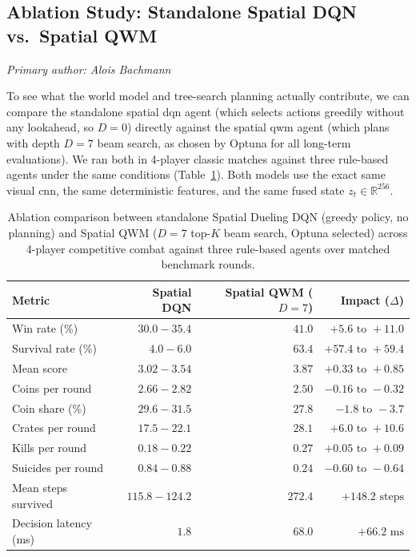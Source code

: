 \subsection{Ablation Study: Standalone Spatial DQN vs.\ Spatial QWM}\label{subsec:spatial_dqn_ablation}

\textit{Primary author: Alois Bachmann}

To see what the world model and tree-search planning actually contribute, we can compare the standalone spatial dqn agent (which selects actions greedily without any lookahead, so $D=0$) directly against the spatial qwm agent (which plans with depth $D=7$ beam search, as chosen by Optuna for all long-term evaluations). We ran both in 4-player classic matches against three rule-based agents under the same conditions (Table~\ref{tab:dqn_vs_qwm_ablation}). Both models use the exact same visual cnn, the same deterministic features, and the same fused state $z_t \in \mathbb{R}^{256}$.

\begin{table}[t]
  \centering
  \small
  \caption{Ablation comparison between standalone Spatial Dueling DQN (greedy policy, no planning) and Spatial QWM ($D=7$ top-$K$ beam search, Optuna selected) across 4-player competitive combat against three rule-based agents over matched benchmark rounds.}
  \label{tab:dqn_vs_qwm_ablation}
  \begin{tabular}{lrrr}
    \toprule
    Metric & Spatial DQN & Spatial QWM ($D=7$) & Impact ($\Delta$) \\
    \midrule
    Win rate (\%)           & $30.0 - 35.4$ & $41.0$ & $+5.6\text{ to }+11.0$ \\
    Survival rate (\%)      & $4.0 - 6.0$   & $63.4$ & $+57.4\text{ to }+59.4$ \\
    Mean score              & $3.02 - 3.54$ & $3.87$ & $+0.33\text{ to }+0.85$ \\
    Coins per round         & $2.66 - 2.82$ & $2.50$ & $-0.16\text{ to }-0.32$ \\
    Coin share (\%)         & $29.6 - 31.5$ & $27.8$ & $-1.8\text{ to }-3.7$ \\
    Crates per round        & $17.5 - 22.1$ & $28.1$ & $+6.0\text{ to }+10.6$ \\
    Kills per round         & $0.18 - 0.22$ & $0.27$ & $+0.05\text{ to }+0.09$ \\
    Suicides per round      & $0.84 - 0.88$ & $0.24$ & $-0.60\text{ to }-0.64$ \\
    Mean steps survived     & $115.8 - 124.2$ & $272.4$ & $+148.2\text{ steps}$ \\
    Decision latency (ms)   & $1.8$         & $68.0$ & $+66.2\text{ ms}$ \\
    \bottomrule
  \end{tabular}
\end{table}


